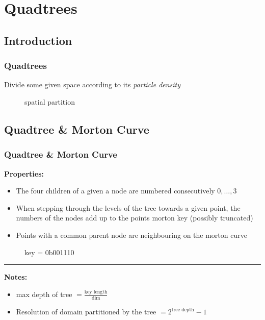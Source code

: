 \section{Quadtrees}
\subsection{Introduction}
\begin{frame}
    \frametitle{Quadtrees}
    Divide some given space according to its \emph{particle density}
    \begin{figure}
        \centering
        \resizebox{\textwidth}{!}{%
            
        }
    \end{figure}
\end{frame}

\begin{frame}
    \begin{figure}
        \centering
        \resizebox{.8\textwidth}{!}{%
            
        }
        \caption{spatial partition}
    \end{figure}
\end{frame}

\subsection{Quadtree \& Morton Curve}
\begin{frame}
    \frametitle{Quadtree \& Morton Curve}
    \textbf{Properties:}
    \begin{itemize}
        \item The four children of a given a node are numbered consecutively
            $0,\dots,3$ \\
        \item When stepping through the levels of the tree towards a given
            point, the numbers of the nodes add up to the points morton key
            (possibly truncated) \\
        \item Points with a common parent node are neighbouring on the morton
            curve
    \end{itemize}
\end{frame}

\begin{frame}
    \begin{figure}
        \centering
        \caption{key = 0b001110}
        \resizebox{.6\textwidth}{!}{%
            
        }
    \end{figure}

    \noindent\rule{\textwidth}{1pt}

    \textbf{Notes:}
    \begin{itemize}
        \item max depth of tree $=\frac{\textrm{key length}}{\textrm{dim}}$ \\
        \item Resolution of domain partitioned by the tree $=2^{\textrm{tree
            depth}}-1$
    \end{itemize}
\end{frame}


